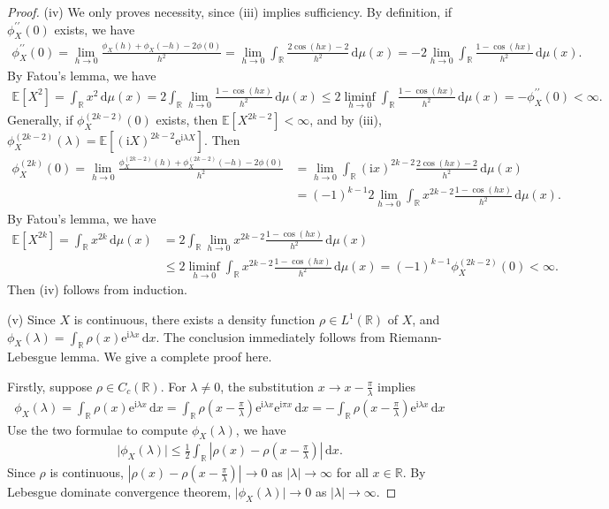 \documentclass{article}
\numberwithin{equation}{section}
\newcommand{\e}{\mathrm{e}}
\newcommand{\E}{\mathbb{E}}
\renewcommand{\d}{\mathrm{d}}
\renewcommand{\i}{\mathrm{i}}
\theoremstyle{plain}
\theoremstyle{definition}
\begin{document}
\begin{proof}
(iv) We only proves necessity, since (iii) implies sufficiency. By definition, if $\phi_X^{\prime\prime}(0)$ exists, we have
\begin{align*}
	\phi_X^{\prime\prime}(0)=\lim_{h\to 0}\frac{\phi_X(h)+\phi_X(-h)-2\phi(0)}{h^2} = \lim_{h\to 0}\int_{\mathbb{R}}\frac{2\cos(hx)-2}{h^2}\,\d \mu(x) = -2\lim_{h\to 0}\int_\mathbb{R}\frac{1-\cos(hx)}{h^2}\,\d \mu(x).
\end{align*}
By Fatou's lemma, we have
\begin{align*}
	\E[X^2] = \int_\mathbb{R}x^2\,\d \mu(x) = 2\int_\mathbb{R}\lim_{h\to 0}\frac{1-\cos(hx)}{h^2}\,\d \mu(x) \leq 2\liminf_{h\to 0}\int_\mathbb{R}\frac{1-\cos(hx)}{h^2}\,\d \mu(x) = -\phi_X^{\prime\prime}(0) < \infty.
\end{align*}
Generally, if $\phi_X^{(2k-2)}(0)$ exists, then $\E[X^{2k-2}]<\infty$, and by (iii), $\phi_X^{(2k-2)}(\lambda)=\E[(\i X)^{2k-2}\e^{\i\lambda X}]$. Then
\begin{align*}
	\phi_X^{(2k)}(0)=\lim_{h\to 0}\frac{\phi_X^{(2k-2)}(h)+\phi_X^{(2k-2)}(-h)-2\phi(0)}{h^2} &= \lim_{h\to 0}\int_{\mathbb{R}}(\i x)^{2k-2}\frac{2\cos(hx)-2}{h^2}\,\d \mu(x)\\
	&= (-1)^{k-1} 2\lim_{h\to 0}\int_\mathbb{R} x^{2k-2}\frac{1-\cos(hx)}{h^2}\,\d \mu(x).
\end{align*}
By Fatou's lemma, we have
\begin{align*}
	\E[X^{2k}] = \int_\mathbb{R}x^{2k}\,\d \mu(x) &= 2\int_\mathbb{R}\lim_{h\to 0}x^{2k-2}\frac{1-\cos(hx)}{h^2}\,\d \mu(x) \\
	&\leq 2\liminf_{h\to 0}\int_\mathbb{R}x^{2k-2}\frac{1-\cos(hx)}{h^2}\,\d \mu(x) = (-1)^{k-1}\phi_X^{(2k-2)}(0) < \infty.
\end{align*}
Then (iv) follows from induction. \vspace{0.1cm}

(v) Since $X$ is continuous, there exists a density function $\rho\in L^1(\mathbb{R})$ of $X$, and $\phi_X(\lambda)=\int_\mathbb{R}\rho(x)\e^{\i\lambda x}\,\d x$. The conclusion immediately follows from Riemann-Lebesgue lemma. We give a complete proof here.

Firstly, suppose $\rho\in C_c(\mathbb{R})$. For $\lambda\neq 0$, the substitution $x\to x-\frac{\pi}{\lambda}$ implies
\begin{align*}
	\phi_X(\lambda)=\int_\mathbb{R}\rho(x)\e^{\i\lambda x}\,\d x = \int_\mathbb{R}\rho\left(x-\frac{\pi}{\lambda}\right)\e^{\i\lambda x}\e^{\i\pi x}\,\d x = -\int_\mathbb{R}\rho\left(x-\frac{\pi}{\lambda}\right)\e^{\i\lambda x}\,\d x
\end{align*}
Use the two formulae to compute $\phi_X(\lambda)$, we have
\begin{align*}
	\vert\phi_X(\lambda)\vert\leq\frac{1}{2}\int_\mathbb{R}\left\vert \rho(x)-\rho\left(x-\frac{\pi}{\lambda}\right)\right\vert\,\d x.
\end{align*}
Since $\rho$ is continuous, $\left\vert\rho(x)-\rho\left(x-\frac{\pi}{\lambda}\right)\right\vert\to 0$ as $\vert\lambda\vert\to\infty$ for all $x\in\mathbb{R}$. By Lebesgue dominate convergence theorem, $\vert\phi_X(\lambda)\vert\to 0$ as $\vert\lambda\vert\to\infty$.


\end{proof}
\end{document}
